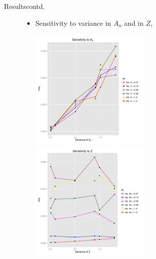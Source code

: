 \documentclass{beamer}
\begin{document}
\begin{frame}{Results}{contd.}
	\begin{figure}
	\vspace{-0.3 in}
		\begin{itemize}\item{Sensitivity to variance in $A_n$ and in $Z$}, \newline\vspace{-0 in}
			\begin{center}
				\vspace*{-0.1 in}
				\hspace*{-0.4in}
				\includegraphics[width=0.55\textwidth]{SenA.pdf} 
	 			 \includegraphics[width=0.55\textwidth]{SenZ.pdf} 
			\end{center}
		\end{itemize}
	\end{figure}
		\vspace{-0.in}
\end{frame}
\end{document}
